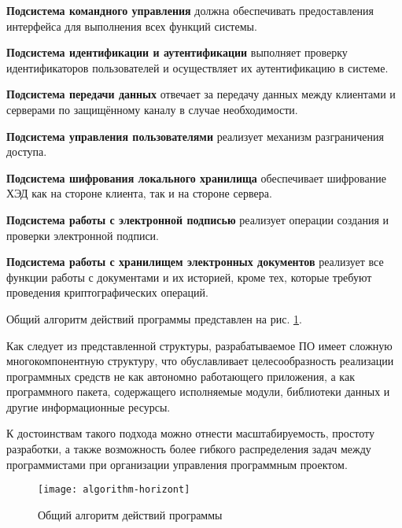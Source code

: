 \vspace{\baselineskip}
\textbf{Подсистема командного управления} должна обеспечивать предоставления интерфейса для выполнения всех функций системы.

\vspace{\baselineskip}
\textbf{Подсистема идентификации и аутентификации} выполняет проверку идентификаторов пользователей и осуществляет их аутентификацию в системе.

\vspace{\baselineskip}
\textbf{Подсистема передачи данных} отвечает за передачу данных между клиентами и  серверами по защищённому каналу в случае необходимости.

\vspace{\baselineskip}
\textbf{Подсистема управления пользователями} реализует механизм разграничения доступа.

\vspace{\baselineskip}
\textbf{Подсистема шифрования локального хранилища} обеспечивает шифрование ХЭД как на стороне клиента, так и на стороне сервера.

\vspace{\baselineskip}
\textbf{Подсистема работы с электронной подписью} реализует операции создания и проверки электронной подписи.

\vspace{\baselineskip}
\textbf{Подсистема работы с хранилищем электронных документов} реализует все функции работы с документами и их историей, кроме тех, которые требуют проведения криптографических операций.

\vspace{\baselineskip}
Общий алгоритм действий программы представлен на рис. \ref{img:algorithm-horizont}.

\vspace{\baselineskip}
Как следует из представленной структуры, разрабатываемое ПО имеет сложную многокомпонентную структуру, что обуславливает целесообразность реализации программных средств не как автономно работающего приложения, а как программного пакета, содержащего исполняемые модули, библиотеки данных и другие информационные ресурсы.

\vspace{\baselineskip}
К достоинствам такого подхода можно отнести масштабируемость, простоту разработки, а также возможность более гибкого распределения задач между программистами при организации управления программным проектом.

\begin{landscape}
\begin{figure}[h!]
  \centering
  \texttt{[image: algorithm-horizont]}
  \caption{Общий алгоритм действий программы}
  \label{img:algorithm-horizont}
\end{figure}
\end{landscape}